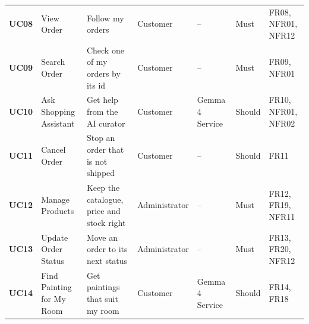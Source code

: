 \begin{longtable}{@{}P{1.0cm}P{3.0cm}P{3.8cm}P{2.2cm}P{2.0cm}P{1.2cm}P{1.3cm}@{}}
\footnotesize \textbf{UC08} & \footnotesize View Order & \footnotesize Follow my orders & \footnotesize Customer & \footnotesize -- & \footnotesize Must & \footnotesize FR08, NFR01, NFR12\\
\footnotesize \textbf{UC09} & \footnotesize Search Order & \footnotesize Check one of my orders by its id & \footnotesize Customer & \footnotesize -- & \footnotesize Must & \footnotesize FR09, NFR01\\
\footnotesize \textbf{UC10} & \footnotesize Ask Shopping Assistant & \footnotesize Get help from the AI curator & \footnotesize Customer & \footnotesize Gemma 4 Service & \footnotesize Should & \footnotesize FR10, NFR01, NFR02\\
\footnotesize \textbf{UC11} & \footnotesize Cancel Order & \footnotesize Stop an order that is not shipped & \footnotesize Customer & \footnotesize -- & \footnotesize Should & \footnotesize FR11\\
\footnotesize \textbf{UC12} & \footnotesize Manage Products & \footnotesize Keep the catalogue, price and stock right & \footnotesize Administrator & \footnotesize -- & \footnotesize Must & \footnotesize FR12, FR19, NFR11\\
\footnotesize \textbf{UC13} & \footnotesize Update Order Status & \footnotesize Move an order to its next status & \footnotesize Administrator & \footnotesize -- & \footnotesize Must & \footnotesize FR13, FR20, NFR12\\
\footnotesize \textbf{UC14} & \footnotesize Find Painting for My Room & \footnotesize Get paintings that suit my room & \footnotesize Customer & \footnotesize Gemma 4 Service & \footnotesize Should & \footnotesize FR14, FR18\\
\end{longtable}
